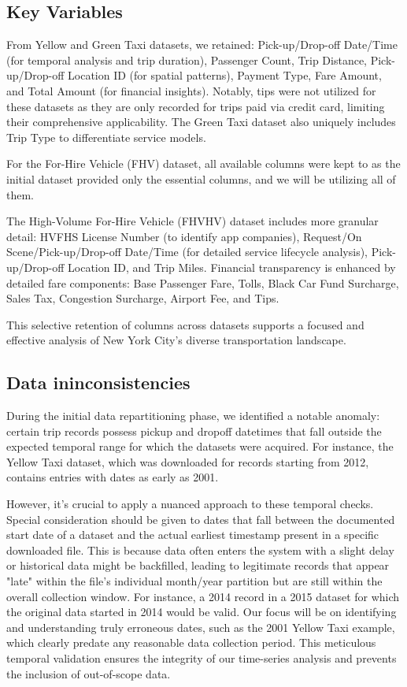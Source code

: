 \documentclass[conference]{IEEEtran}
\begin{document}
\subsection{Key Variables}
From Yellow and Green Taxi datasets, we retained: Pick-up/Drop-off Date/Time (for temporal analysis and trip duration),
Passenger Count, Trip Distance, Pick-up/Drop-off Location ID (for spatial patterns), Payment Type, Fare Amount, and
Total Amount (for financial insights). Notably, tips were not utilized for these datasets as they are only recorded
for trips paid via credit card, limiting their comprehensive applicability. The Green Taxi dataset also uniquely
includes Trip Type to differentiate service models.

For the For-Hire Vehicle (FHV) dataset, all available columns were kept to as the initial dataset provided only the
essential columns, and we will be utilizing all of them.

The High-Volume For-Hire Vehicle (FHVHV) dataset includes more granular detail: HVFHS License Number (to identify app
companies), Request/On Scene/Pick-up/Drop-off Date/Time (for detailed service lifecycle analysis), Pick-up/Drop-off
Location ID, and Trip Miles. Financial transparency is enhanced by detailed fare components: Base Passenger Fare, Tolls,
Black Car Fund Surcharge, Sales Tax, Congestion Surcharge, Airport Fee, and Tips.

This selective retention of columns across datasets supports a focused and effective analysis of New York City's diverse
transportation landscape.

\subsection{Data ininconsistencies}
During the initial data repartitioning phase, we identified a notable anomaly: certain trip records possess pickup and
dropoff datetimes that fall outside the expected temporal range for which the datasets were acquired.
For instance, the Yellow Taxi dataset, which was downloaded for records starting from 2012, contains entries
with dates as early as 2001.

However, it's crucial to apply a nuanced approach to these temporal checks. Special consideration should be given to
dates that fall between the documented start date of a dataset and the actual earliest timestamp present in a specific
downloaded file. This is because data often enters the system with a slight delay or historical data might be backfilled,
leading to legitimate records that appear "late" within the file's individual month/year partition but are still within
the overall collection window. For instance, a 2014 record in a 2015 dataset for which the original data started in 2014
would be valid. Our focus will be on identifying and understanding truly erroneous dates, such as the 2001 Yellow Taxi
example, which clearly predate any reasonable data collection period. This meticulous temporal validation ensures the
integrity of our time-series analysis and prevents the inclusion of out-of-scope data.
\end{document}
